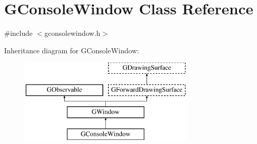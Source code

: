 \hypertarget{classGConsoleWindow}{}\section{G\+Console\+Window Class Reference}
\label{classGConsoleWindow}


{\ttfamily \#include $<$gconsolewindow.\+h$>$}

Inheritance diagram for G\+Console\+Window\+:\begin{figure}[H]
\begin{center}
\leavevmode
\includegraphics[height=4.000000cm]{classGConsoleWindow}
\end{center}
\end{figure}
